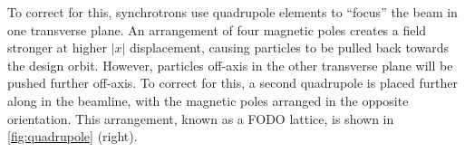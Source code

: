 \documentclass[11pt]{report}
\begin{document}
To correct for this, synchrotrons use quadrupole elements to ``focus'' the beam in one transverse plane. An arrangement of four magnetic poles creates a field stronger at higher $|x|$ displacement, causing particles to be pulled back towards the design orbit. However, particles off-axis in the other transverse plane will be pushed further off-axis. To correct for this, a second quadrupole is placed further along in the beamline, with the magnetic poles arranged in the opposite orientation. This arrangement, known as a FODO lattice, is shown in \autoref{fig:quadrupole} (right).

\begin{figure}
\centering
{} %
\begin{tikzpicture}[x=0.75pt,y=0.75pt,yscale=-1,xscale=1]


\end{tikzpicture}
\end{figure}
\end{document}
